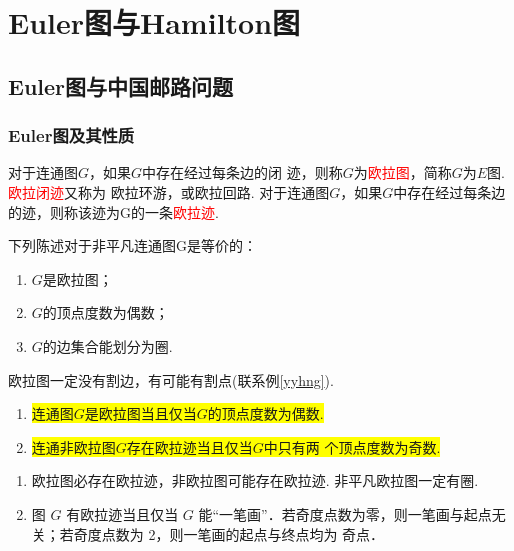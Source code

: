 
\section{Euler图与Hamilton图}
\subsection{Euler图与中国邮路问题}
\subsubsection{Euler图及其性质}
\begin{definition}
对于连通图$G$，如果$G$中存在经过每条边的闭
迹，则称$G$为\textcolor{red}{欧拉图}，简称$G$为$E$图. \textcolor{red}{欧拉闭迹}又称为
欧拉环游，或欧拉回路. 对于连通图$G$，如果$G$中存在经过每条边的迹，则称该迹为G的一条\textcolor{red}{欧拉迹}.
\end{definition}
\begin{theorem}
	下列陈述对于非平凡连通图G是等价的：
	\begin{enumerate}
		\item $G$是欧拉图；
		\item $G$的顶点度数为偶数；
		\item $G$的边集合能划分为圈.
	\end{enumerate}
\end{theorem}
\begin{note}
	欧拉图一定没有割边，有可能有割点(联系例\ref{yyhng}).
\end{note}
\begin{corollary}
	\begin{enumerate}
		\item \colorbox{yellow}{连通图$G$是欧拉图当且仅当$G$的顶点度数为偶数.}
		\item \colorbox{yellow}{连通非欧拉图$G$存在欧拉迹当且仅当$G$中只有两
			个顶点度数为奇数.}
	\end{enumerate}
\end{corollary}
\begin{note}
	\begin{enumerate}
		\item 	欧拉图必存在欧拉迹，非欧拉图可能存在欧拉迹. 非平凡欧拉图一定有圈.
		\item   图 $G$ 有欧拉迹当且仅当 $G$ 能“一笔画”．若奇度点数为零，则一笔画与起点无关；若奇度点数为 2，则一笔画的起点与终点均为
		奇点．
	\end{enumerate}

	
	
	
\end{note}

